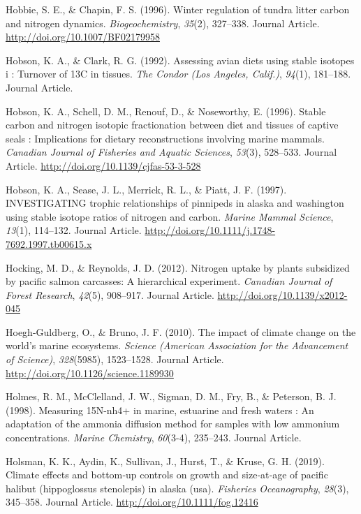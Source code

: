 \documentclass [11pt, proquest] {uwthesis}[2015/03/03]
\begin{document}
\hypertarget{ref-Hobbie1996}{}
Hobbie, S. E., \& Chapin, F. S. (1996). Winter regulation of tundra
litter carbon and nitrogen dynamics. \emph{Biogeochemistry},
\emph{35}(2), 327--338. Journal Article.
\url{http://doi.org/10.1007/BF02179958}

\hypertarget{ref-Hobson1992}{}
Hobson, K. A., \& Clark, R. G. (1992). Assessing avian diets using
stable isotopes i : Turnover of 13C in tissues. \emph{The Condor (Los
Angeles, Calif.)}, \emph{94}(1), 181--188. Journal Article.

\hypertarget{ref-Hobson1996}{}
Hobson, K. A., Schell, D. M., Renouf, D., \& Noseworthy, E. (1996).
Stable carbon and nitrogen isotopic fractionation between diet and
tissues of captive seals : Implications for dietary reconstructions
involving marine mammals. \emph{Canadian Journal of Fisheries and
Aquatic Sciences}, \emph{53}(3), 528--533. Journal Article.
\url{http://doi.org/10.1139/cjfas-53-3-528}

\hypertarget{ref-Hobson1997}{}
Hobson, K. A., Sease, J. L., Merrick, R. L., \& Piatt, J. F. (1997).
INVESTIGATING trophic relationships of pinnipeds in alaska and
washington using stable isotope ratios of nitrogen and carbon.
\emph{Marine Mammal Science}, \emph{13}(1), 114--132. Journal Article.
\url{http://doi.org/10.1111/j.1748-7692.1997.tb00615.x}

\hypertarget{ref-Hocking2012}{}
Hocking, M. D., \& Reynolds, J. D. (2012). Nitrogen uptake by plants
subsidized by pacific salmon carcasses: A hierarchical experiment.
\emph{Canadian Journal of Forest Research}, \emph{42}(5), 908--917.
Journal Article. \url{http://doi.org/10.1139/x2012-045}

\hypertarget{ref-Hoegh2010}{}
Hoegh-Guldberg, O., \& Bruno, J. F. (2010). The impact of climate change
on the world's marine ecosystems. \emph{Science (American Association
for the Advancement of Science)}, \emph{328}(5985), 1523--1528. Journal
Article. \url{http://doi.org/10.1126/science.1189930}

\hypertarget{ref-Holmes1998}{}
Holmes, R. M., McClelland, J. W., Sigman, D. M., Fry, B., \& Peterson,
B. J. (1998). Measuring 15N-nh4+ in marine, estuarine and fresh waters :
An adaptation of the ammonia diffusion method for samples with low
ammonium concentrations. \emph{Marine Chemistry}, \emph{60}(3-4),
235--243. Journal Article.

\hypertarget{ref-Holsman2019}{}
Holsman, K. K., Aydin, K., Sullivan, J., Hurst, T., \& Kruse, G. H.
(2019). Climate effects and bottom‐up controls on growth and size‐at‐age
of pacific halibut (hippoglossus stenolepis) in alaska (usa).
\emph{Fisheries Oceanography}, \emph{28}(3), 345--358. Journal Article.
\url{http://doi.org/10.1111/fog.12416}
\end{document}
